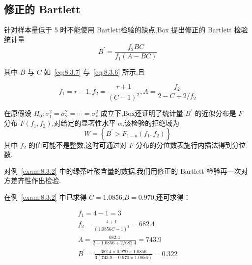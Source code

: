 \subsection{修正的 Bartlett}

针对样本量低于 5 时不能使用 Bartlett检验的缺点,Box 提出修正的 Bartlett 检验统计量
\begin{equation}\label{eq:8.3.9}
  B^{\prime}=\frac{f_{2} B C}{f_{1}(A-B C)}
\end{equation}

其中 $B$ 与 $C$ 如~\eqref{eq:8.3.7} 与~\eqref{eq:8.3.6} 所示,且

\begin{equation*}
  f_{1}=r-1, f_{2}=\frac{r+1}{(C-1)^{2}}, A=\frac{f_{2}}{2-C+2 / f_{2}}
\end{equation*}

在原假设 $H_0:\sigma^2_1=\sigma_2^2=\cdots=\sigma^2_r$ 成立下,Box还证明了统计量 $B^{\prime}$ 的近似分布是 $F$ 分布 $F(f_1,f_2)$,对给定的显著性水平 $\alpha$,该检验的拒绝域为 
\begin{equation}\label{eq:8.3.10}
  W=\left\{B^{\prime}>F_{1-a}\left(f_{1}, f_{2}\right)\right\}
\end{equation}
其中 $f_2$ 的值可能不是整数,这时可通过对 $F$ 分布的分位数表施行内插法得到分位数.


\begin{example}\label{exam:8.3.3}
对例~\ref{exam:8.3.2} 中的绿茶叶酸含量的数据,我们用修正的 Bartlett 检验再一次对方差齐性作出检验.
\end{example}


在例~\ref{exam:8.3.2} 中已求得 $ C=1.0856 $,$ B=0.970 $,还可求得：

\begin{equation*}
\begin{array}{l}{f_{1}=4-1=3} \\ 
{f_{2}=\frac{4+1}{(1.0856 C-1)^{2}}=682.4} \\ 
{A=\frac{682.4}{2-1.0856+2 / 682.4}=743.9} \\ 
{B^{\prime}=\frac{682.4 \times 0.970 \times 1.0856}{3(743.9-0.970 \times 1.0856)}=0.322}
\end{array}
\end{equation*}

